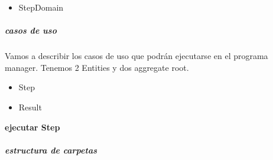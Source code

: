 \begin{itemize}
    \item StepDomain
\end{itemize}

\subparagraph{casos de uso}

Vamos a describir los casos de uso que podrán ejecutarse en el programa manager. Tenemos 2 Entities y dos aggregate root.

\begin{itemize}
    \item Step
    \item Result
\end{itemize}

\textbf{ejecutar Step}

\subparagraph{estructura de carpetas}







